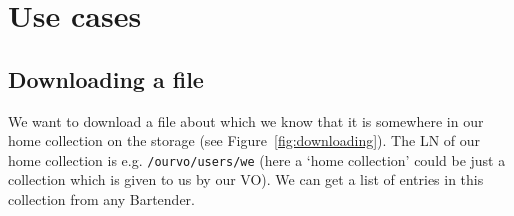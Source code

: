\documentclass{book}
\begin{document}

\chapter{Use cases} %
\label{cha:use_cases}

\section{Downloading a file} %
\label{sec:downloading_a_file}
\begin{figure}[ht]
\end{figure}

We want to download a file about which we know that it is somewhere in our home collection on the storage (see Figure~\ref{fig:downloading}). The LN of our home collection is e.g. \verb#/ourvo/users/we# (here a `home collection' could be just a collection which is given to us by our VO). We can get a list of entries in this collection from any Bartender.
\end{document}
